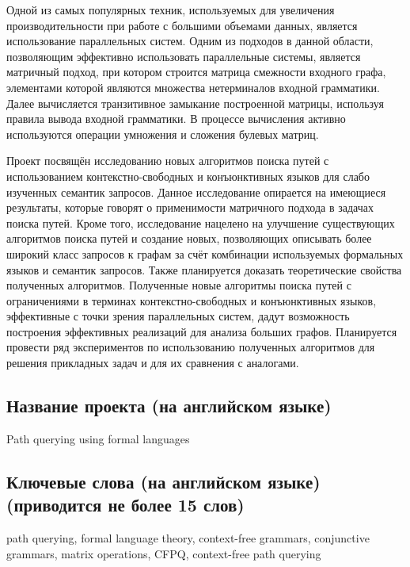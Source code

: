 \documentclass[12pt]{article}  %
\theoremstyle{remark}
\begin{document}
Одной из самых популярных техник, используемых для увеличения производительности при работе с большими объемами данных, является использование параллельных систем. Одним из подходов в данной области, позволяющим эффективно использовать параллельные системы, является матричный подход, при котором строится матрица смежности входного графа, элементами которой являются множества нетерминалов входной грамматики. Далее вычисляется транзитивное замыкание построенной матрицы, используя правила вывода входной грамматики. В процессе вычисления активно используются операции умножения и сложения булевых матриц.

Проект посвящён исследованию новых алгоритмов поиска путей с использованием контекстно-свободных и конъюнктивных языков для слабо изученных семантик запросов. Данное исследование опирается на имеющиеся результаты, которые говорят о применимости матричного подхода в задачах поиска путей. Кроме того, исследование нацелено на улучшение существующих алгоритмов поиска путей и создание новых, позволяющих описывать более широкий класс запросов к графам за счёт комбинации используемых формальных языков и семантик запросов. Также планируется доказать теоретические свойства полученных алгоритмов. Полученные новые алгоритмы поиска путей с ограничениями в терминах контекстно-свободных и конъюнктивных языков, эффективные с точки зрения параллельных систем, дадут возможность построения эффективных реализаций для анализа больших графов. Планируется провести ряд экспериментов по использованию полученных алгоритмов для решения прикладных задач и для их сравнения с аналогами.


\subsection{Название проекта (на английском языке)}
Path querying using formal languages

\subsection{Ключевые слова (на английском языке)(приводится не более 15 слов)}
path querying, formal language theory, context-free grammars, conjunctive grammars, matrix operations, CFPQ, context-free path querying
\end{document}
